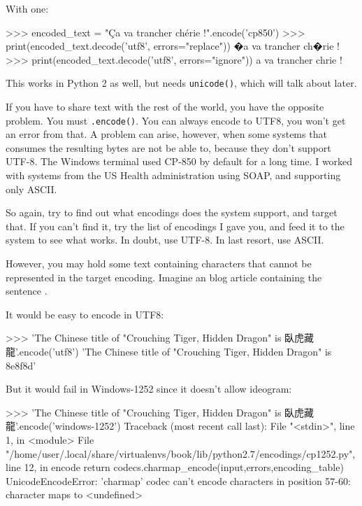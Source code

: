 With one:

\begin{py3}
>>> encoded_text = "Ça va trancher chérie !".encode('cp850')
>>> print(encoded_text.decode('utf8', errors="replace"))
�a va trancher ch�rie !
>>> print(encoded_text.decode('utf8', errors="ignore"))
a va trancher chrie !
\end{py3}

This works in Python 2 as well, but needs \lstinline{unicode()}, which will talk about later.

If you have to share text with the rest of the world, you have the opposite problem. You must \lstinline{.encode()}. You can always encode to UTF8, you won't get an error from that. A problem can arise, however, when some systems that consumes the resulting bytes are not be able to, because they don't support UTF-8. The Windows terminal used CP-850 by default for a long time. I worked with systems from the US Health administration using SOAP, and supporting only ASCII.

So again, try to find out what encodings does the system support, and target that. If you can't find it, try the list of encodings I gave you, and feed it to the system to see what works. In doubt, use UTF-8. In last resort, use ASCII.

However, you may hold some text containing characters that cannot be represented in the target encoding. Imagine an blog article containing the sentence .

It would be easy to encode in UTF8:

\begin{py3}
>>> 'The Chinese title of "Crouching Tiger, Hidden Dragon" is 臥虎藏龍'.encode('utf8')
'The Chinese title of "Crouching Tiger, Hidden Dragon" is \x8e\x8f\xbe\x8d'
\end{py3}

But it would fail in Windows-1252 since it doesn't allow ideogram:

\begin{py3}
>>> 'The Chinese title of "Crouching Tiger, Hidden Dragon" is 臥虎藏龍'.encode('windows-1252')
Traceback (most recent call last):
    File "<stdin>", line 1, in <module>
    File "/home/user/.local/share/virtualenvs/book/lib/python2.7/encodings/cp1252.py", line 12, in encode
    return codecs.charmap_encode(input,errors,encoding_table)
UnicodeEncodeError: 'charmap' codec can't encode characters in position 57-60: character maps to <undefined>
\end{py3}

